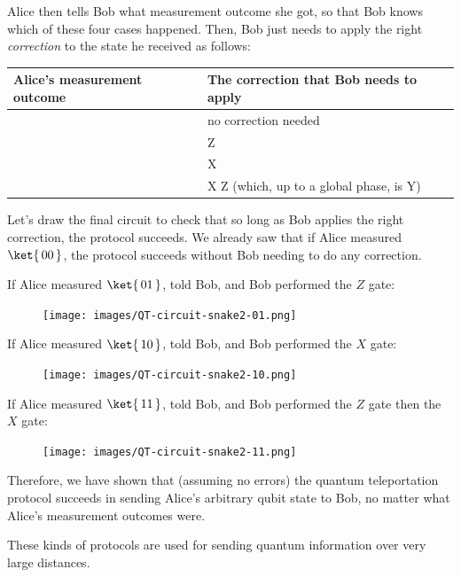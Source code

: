 \documentclass{article}
\theoremstyle{definition}
\newcommand{\kz}[1]{\ket{\,#1\,}}
\begin{document}
Alice then tells Bob what measurement outcome she got, so that Bob knows which of these four cases happened.
Then, Bob just needs to apply the right \emph{correction} to the state he received as follows:

\begin{table}
	\centering
	\begin{tabular}{|l|l|}
		\hline
		Alice's measurement outcome & The correction that Bob needs to apply\\ \hline
		\kz{00} & no correction needed\\ \hline
		\kz{01} & Z\\ \hline
		\kz{10} & X\\ \hline
		\kz{11} & X Z (which, up to a global phase, is Y)\\ \hline
	\end{tabular}	
\end{table}

Let's draw the final circuit to check that so long as Bob applies the right correction, the protocol succeeds.
We already saw that if Alice measured $\kz{00}$, the protocol succeeds without Bob needing to do any correction.


If Alice measured $\kz{01}$, told Bob, and Bob performed the $Z$ gate:
\nopagebreak
\begin{figure}[H]
	\centering
	\texttt{[image: images/QT-circuit-snake2-01.png]}
\end{figure}

If Alice measured $\kz{10}$, told Bob, and Bob performed the $X$ gate:
\nopagebreak
\begin{figure}[H]
	\centering
	\texttt{[image: images/QT-circuit-snake2-10.png]}
\end{figure}

If Alice measured $\kz{11}$, told Bob, and Bob performed the $Z$ gate then the $X$ gate:
\nopagebreak
\begin{figure}[H]
	\centering
	\texttt{[image: images/QT-circuit-snake2-11.png]}
\end{figure}

Therefore, we have shown that (assuming no errors) the quantum teleportation protocol succeeds in sending Alice's arbitrary qubit state to Bob, no matter what Alice's measurement outcomes were.

These kinds of protocols are used for sending quantum information over very large distances.


\end{document}
